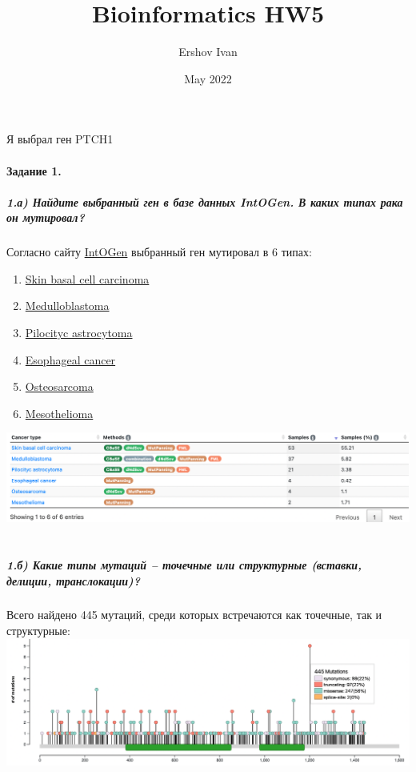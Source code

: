 \documentclass[12pt]{article}
\title{Bioinformatics HW5}
\author{Ershov Ivan}
\date{May 2022}
\begin{document}
\maketitle
Я выбрал ген PTCH1
\paragraph{Задание 1.}
\subparagraph{1.а) Найдите выбранный ген в базе данных IntOGen. В каких типах рака он мутировал?\\}

Согласно сайту \href{https://www.intogen.org/search?gene=PTCH1}{IntOGen} выбранный ген мутировал в 6 типах:\\
\begin{enumerate}
    \item \href{https://www.intogen.org/search?cancer=SBCC}{Skin basal cell carcinoma}
    \item \href{https://www.intogen.org/search?cancer=MBL}{Medulloblastoma}
    \item \href{https://www.intogen.org/search?cancer=PIA}{Pilocityc astrocytoma}
    \item \href{https://www.intogen.org/search?cancer=ESCA}{Esophageal cancer}
    \item \href{https://www.intogen.org/search?cancer=OS}{Osteosarcoma}
    \item \href{https://www.intogen.org/search?cancer=MESO}{Mesothelioma}
\end{enumerate}
\includegraphics[width=\textwidth]{images/image1.png}\\\\
\subparagraph{1.б) Какие типы мутаций – точечные или структурные (вставки, делиции, транслокации)?\\}
Всего найдено 445 мутаций, среди которых встречаются как точечные, так и структурные:\\
\includegraphics[width=\textwidth]{images/image2.png}\\\\
\end{document}
